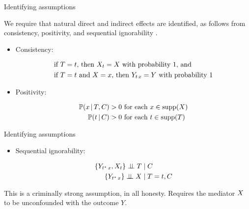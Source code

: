 \documentclass{beamer}
\theoremstyle{remark}
\begin{document}
\begin{frame}{Identifying assumptions}

    We require that natural direct and indirect effects are identified, as follows from consistency, positivity, and sequential ignorability \citep{imai_identification_2010}.

    \begin{itemize}

        \item Consistency:

              \begin{equation*}
                  \begin{aligned}
                       & \text{if $T = t$, then $X_t = X$ with probability 1, and}               \\
                       & \text{if $T = t$ and $X = x$, then $Y_{t \, x} = Y$ with probability 1}
                  \end{aligned}
              \end{equation*}

        \item Positivity:

              \begin{equation*}
                  \begin{aligned}
                      \P[T, \C]{x} & > 0 \text{ for each }  x \in \supp(\X) \\
                      \P[\C]{t}    & > 0 \text{ for each }  t \in \supp(T)
                  \end{aligned}
              \end{equation*}

    \end{itemize}

\end{frame}

\begin{frame}{Identifying assumptions}

    \begin{itemize}

        \item Sequential ignorability:

              \begin{equation*}
                  \begin{aligned}
                      \{Y_{t^* \, x}, X_t\} \perp \!\!\! \perp T & \mid C        \\
                      \{Y_{t^* \, x}\} \perp \!\!\! \perp X      & \mid T = t, C
                  \end{aligned}
              \end{equation*}

    \end{itemize}

    This is a criminally strong assumption, in all honesty. Requires the mediator $X$ to be unconfounded with the outcome $Y$.

\end{frame}
\end{document}
